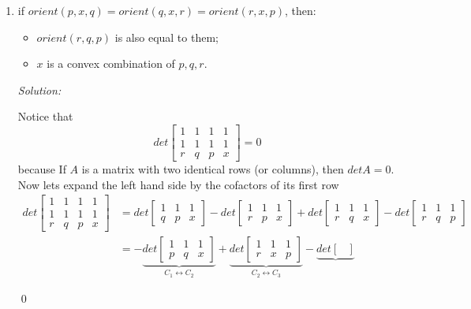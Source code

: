 \documentclass[a4paper, 8pt, oneside]{article}
\newenvironment{sol}
    {\emph{Solution:}
    }
    {
    \qed
    }
\begin{document}
\begin{enumerate}
\begin{enumerate}
\item \label{itm:interiority} if $orient(p,x,q) =orient(q,x,r) = orient(r,x,p)$, then:
\begin{itemize}
\item $orient(r,q,p)$ is also equal to them;
\item $x$ is a convex combination of $p,q,r$.
\end{itemize}
\begin{sol}
Notice that
\begin{equation*} det
\begin{bmatrix}
    1 &1 & 1 & 1\\
    1 &1 & 1 & 1\\
    r &q & p & x
\end{bmatrix} = 0
\end{equation*}
because If $A$ is a matrix with two identical rows (or columns), then $det A = 0$.
Now lets expand the left hand side by the cofactors of its first row
\begin{align*}
det
\begin{bmatrix}
    1 &1 & 1 & 1\\
    1 &1 & 1 & 1\\
    r &q & p & x
\end{bmatrix} &=
det
\begin{bmatrix}
    1 & 1 & 1\\
    q& p & x
\end{bmatrix} -
det
\begin{bmatrix}
    1 & 1 & 1\\
    r & p& x
\end{bmatrix} +
det
\begin{bmatrix}
    1 & 1 & 1\\
    r & q & x
\end{bmatrix} -
det
\begin{bmatrix}
    1 & 1 & 1\\
    r & q & p
\end{bmatrix} \\&=
- \underbrace{det\begin{bmatrix}
    1 & 1 & 1\\
    p& q & x
\end{bmatrix}}_{C_1 \leftrightarrow C_2}
+ \underbrace{det
\begin{bmatrix}
    1 & 1 & 1\\
    r & x& p
\end{bmatrix}}_{C_2 \leftrightarrow C_3}
-\underbrace{det
\begin{bmatrix}

\end{bmatrix}}
\end{align*}
\end{sol}
\end{enumerate}
\end{enumerate}
\end{document}

